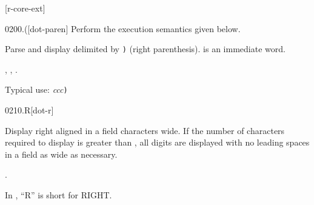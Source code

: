 
\ifanswerfiles

	[r-core-ext]
\fi

%
%
%


\begin{worddef}[.p]{0200}{.(}[dot-paren]
\compile
	Perform the execution semantics given below.

\execute

	Parse and display  delimited by \texttt{)} (right
	parenthesis).  is an immediate word.

\see {},
	,
	.

	\begin{rationale} %
		Typical use:
			 \emph{ccc}\texttt{)}
	\end{rationale}
\end{worddef}

\vspace*{-2ex}
\begin{worddef}{0210}{.R}[dot-r]
\item {}

	Display  right aligned in a field 
	characters wide. If the number of characters required to display
	 is greater than , all digits are displayed
	with no leading spaces in a field as wide as necessary.

\see {}.

	\begin{rationale} %
		In , ``R'' is short for RIGHT.
	\end{rationale}
\end{worddef}

